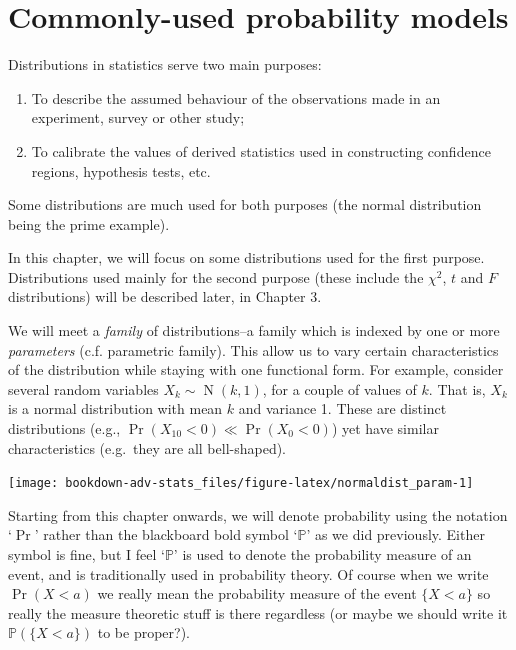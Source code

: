 \documentclass[
]{book}
\providecommand{\tightlist}{%
  \setlength{\itemsep}{0pt}\setlength{\parskip}{0pt}}
\DeclareMathOperator{\N}{N}
\newcommand{\bbP}{\mathbb{P}}
\theoremstyle{definition}
\theoremstyle{definition}
\theoremstyle{definition}
\theoremstyle{definition}
\theoremstyle{remark}
\begin{document}
\hypertarget{commonly-used-probability-models}{%
\chapter{Commonly-used probability models}\label{commonly-used-probability-models}}

Distributions in statistics serve two main purposes:

\begin{enumerate}
\def\labelenumi{\arabic{enumi}.}
\tightlist
\item
  To describe the assumed behaviour of the observations made in an experiment, survey or other study;
\item
  To calibrate the values of derived statistics used in constructing confidence regions, hypothesis tests, etc.
\end{enumerate}

Some distributions are much used for both purposes (the normal distribution being the prime example).

In this chapter, we will focus on some distributions used for the first purpose.
Distributions used mainly for the second purpose (these include the \(\chi^2\), \(t\) and \(F\) distributions) will be described later, in Chapter 3.

We will meet a \emph{family} of distributions--a family which is indexed by one or more \emph{parameters} (c.f. parametric family).
This allow us to vary certain characteristics of the distribution while staying with one functional form.
For example, consider several random variables \(X_k\sim\N(k,1)\), for a couple of values of \(k\).
That is, \(X_k\) is a normal distribution with mean \(k\) and variance 1.
These are distinct distributions (e.g., \(\Pr(X_{10} < 0) \ll \Pr(X_0 < 0)\)) yet have similar characteristics (e.g.~they are all bell-shaped).

\begin{center}\texttt{[image: bookdown-adv-stats\_files/figure-latex/normaldist\_param-1]} \end{center}

Starting from this chapter onwards, we will denote probability using the notation `\(\Pr\)' rather than the blackboard bold symbol `\(\bbP\)' as we did previously.
Either symbol is fine, but I feel `\(\bbP\)' is used to denote the probability measure of an event, and is traditionally used in probability theory.
Of course when we write \(\Pr(X<a)\) we really mean the probability measure of the event \(\{ X < a\}\) so really the measure theoretic stuff is there regardless (or maybe we should write it \(\bbP(\{X < a\})\) to be proper?).
\end{document}
